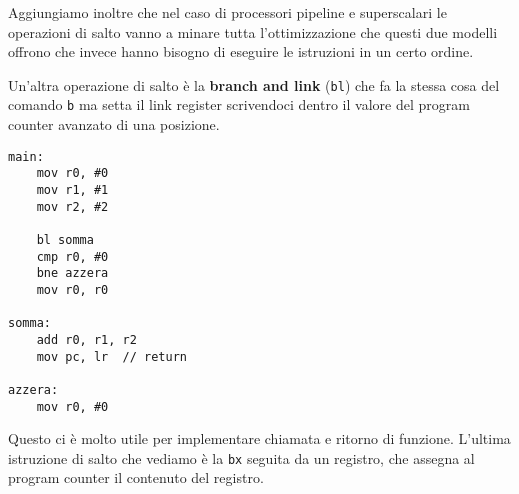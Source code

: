 Aggiungiamo inoltre che nel caso di processori pipeline e superscalari le operazioni di salto vanno
a minare tutta l'ottimizzazione che questi due modelli offrono che invece hanno bisogno di eseguire
le istruzioni in un certo ordine.

Un'altra operazione di salto è la \textbf{branch and link} (\verb|bl|) che fa la stessa cosa del
comando \verb|b| ma setta il link register scrivendoci dentro il valore del program counter
avanzato di una posizione.
\begin{verbatim}
main:
	mov r0, #0
	mov r1, #1
	mov r2, #2
	
	bl somma
	cmp r0, #0
	bne azzera
	mov r0, r0

somma:
	add r0, r1, r2
	mov pc, lr	// return

azzera:
	mov r0, #0
\end{verbatim}
Questo ci è molto utile per implementare chiamata e ritorno di funzione. L'ultima istruzione di
salto che vediamo è la \verb|bx| seguita da un registro, che assegna al program counter il
contenuto del registro.

